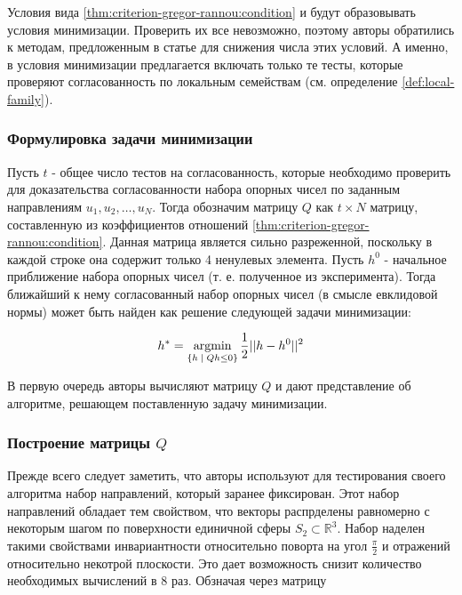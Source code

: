 \documentclass[a4paper, 12pt, titlepage]{article}
\theoremstyle{definition}
\theoremstyle{plain}
\theoremstyle{plain}
\begin{document}
Условия вида \ref{thm:criterion-gregor-rannou:condition} и будут образовывать
условия минимизации. Проверить их все невозможно, поэтому авторы обратились к
методам, предложенным в статье \cite{journals/jmiv/KarlKVW96} для снижения числа
этих условий. А именно, в условия минимизации предлагается включать только те
тесты, которые проверяют согласованность по локальным семействам (см. 
определение \ref{def:local-family}).

\subsubsection{Формулировка задачи минимизации}

Пусть $t$ - общее число тестов на согласованность, которые необходимо проверить
для доказательства согласованности набора опорных чисел по заданным 
направлениям $u_{1}, u_{2}, \ldots, u_{N}$. Тогда обозначим матрицу $Q$ как
$t \times N$ матрицу, составленную из коэффициентов отношений
\ref{thm:criterion-gregor-rannou:condition}. Данная матрица является сильно
разреженной, поскольку в каждой строке она содержит только 4 ненулевых элемента.
Пусть $h^{0}$ - начальное приближение набора опорных чисел (т. е. полученное из
эксперимента). Тогда ближайший к нему согласованный набор опорных чисел (в
смысле евклидовой нормы) может быть найден как решение следующей задачи
минимизации:

\begin{equation}
 \label{eq:gregor-rannou-algorithm}
 h^{*} = \operatornamewithlimits{argmin}_{\{h \; | \; Q h \leq 0\}}
 \frac{1}{2} ||h - h^{0}||^{2}
\end{equation}

В первую очередь авторы вычисляют матрицу $Q$ и дают представление об алгоритме,
решающем поставленную задачу минимизации.

\subsubsection{Построение матрицы $Q$}

Прежде всего следует заметить, что авторы используют для тестирования своего
алгоритма набор направлений, который заранее фиксирован. Этот набор направлений
обладает тем свойством, что векторы распрделены равномерно с некоторым шагом по
поверхности единичной сферы $S_{2} \subset \mathbb{R}^{3}$. Набор наделен такими
свойствами инвариантности относительно поворта на угол $\frac{\pi}{2}$ и 
отражений относительно некотрой плоскости. Это дает возможность снизит 
количество необходимых вычислений в 8 раз. Обзначая через матрицу
\end{document}
